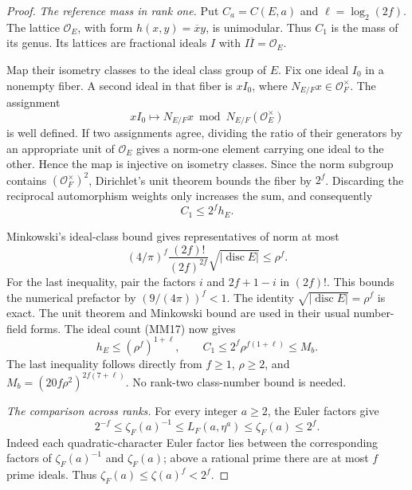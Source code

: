 \begin{proof}
\smallskip\noindent\emph{The reference mass in rank one.}
Put \(C_a=C(E,a)\) and \(\ell=\log_2(2f)\).
The lattice \(\mathcal O_E\), with form
\(h(x,y)=\overline x y\), is unimodular.  Thus \(C_1\)
is the mass of its genus.  Its lattices are fractional ideals
\(I\) with \(I\overline I=\mathcal O_E\).

Map their isometry classes to the ideal class group of \(E\).
Fix one ideal \(I_0\) in a nonempty fiber.  A second ideal in
that fiber is \(xI_0\), where \(N_{E/F}x\in\mathcal O_F^\times\).
The assignment
\[
 xI_0\longmapsto
     N_{E/F}x\bmod N_{E/F}(\mathcal O_E^\times)
 \tag{PG14}
\]
is well defined.  If two assignments agree, dividing the
ratio of their generators by an appropriate unit of
\(\mathcal O_E\) gives a norm-one element carrying one ideal
to the other.  Hence the map is injective on isometry classes.
Since the norm subgroup contains
\((\mathcal O_F^\times)^2\), Dirichlet's unit theorem bounds
the fiber by \(2^f\).  Discarding the reciprocal automorphism
weights only increases the sum, and consequently
\[
                             C_1\leq2^fh_E.
 \tag{PG15}
\]

Minkowski's ideal-class bound gives representatives of norm
at most
\[
 (4/\pi)^f\frac{(2f)!}{(2f)^{2f}}
                  \sqrt{|\operatorname{disc}E|}
                       \leq \rho^f.
 \tag{PG16}
\]
For the last inequality, pair the factors \(i\) and
\(2f+1-i\) in \((2f)!\).  This bounds the numerical
prefactor by \((9/(4\pi))^f<1\).  The identity
\(\sqrt{|\operatorname{disc}E|}=\rho^f\) is exact.
The unit theorem and Minkowski bound are used in their
usual number-field forms.\cite[Theorems 4.3 and 5.1]{milne-ant}
The ideal count (MM17) now gives
\[
 h_E\leq(\rho^f)^{1+\ell},\qquad
 C_1\leq2^f\rho^{f(1+\ell)}\leq M_b.
 \tag{PG17}
\]
The last inequality follows directly from \(f\geq1\),
\(\rho\geq2\), and \(M_b=(20f\rho^2)^{2f(7+\ell)}\).
No rank-two class-number bound is needed.

\smallskip\noindent\emph{The comparison across ranks.}
For every integer \(a\geq2\), the Euler factors give
\[
 2^{-f}\leq \zeta_F(a)^{-1}
       \leq L_F(a,\eta^a)\leq\zeta_F(a)\leq2^f.
 \tag{PG18}
\]
Indeed each quadratic-character Euler factor lies between
the corresponding factors of \(\zeta_F(a)^{-1}\) and
\(\zeta_F(a)\); above a rational prime there are at most
\(f\) prime ideals.  Thus \(\zeta_F(a)\leq\zeta(a)^f<2^f\).


\end{proof}
